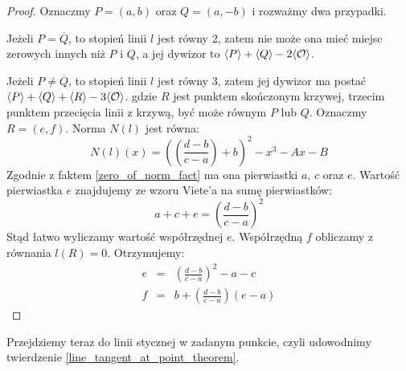 \begin{proof}
Oznaczmy $P = (a, b)$ oraz $Q = (a, -b)$
i rozważmy dwa przypadki.

Jeżeli $P = \overline{Q}$,
to stopień linii $l$ jest równy $2$,
zatem nie może ona mieć miejsc zerowych innych niż $P$ i $Q$,
a jej dywizor to $\langle P\rangle + \langle Q\rangle - 2\langle\mathcal{O}\rangle$.

Jeżeli $P \neq \overline{Q}$,
to stopień linii $l$ jest równy $3$,
zatem jej dywizor ma postać
$\langle P\rangle + \langle Q\rangle + \langle R\rangle - 3\langle\mathcal{O}\rangle$.
gdzie $R$ jest punktem skończonym krzywej,
trzecim punktem przecięcia linii z krzywą,
być może równym $P$ lub $Q$.
Oznaczmy $R = (e, f)$.
Norma $N(l)$ jest równa:
\begin{equation*}
N(l)(x) = \left(\left(\frac{d-b}{c-a}\right) + b\right)^2 - x^3 - Ax - B
\end{equation*}
Zgodnie z faktem \ref{zero_of_norm_fact}
ma ona pierwiastki $a$, $c$ oraz $e$.
Wartość pierwiastka $e$ znajdujemy ze wzoru Viete'a na sumę pierwiastków:
\begin{equation*}
a + c + e = \left(\frac{d-b}{c-a}\right)^2
\end{equation*}
Stąd łatwo wyliczamy wartość współrzędnej $e$.
Współrzędną $f$ obliczamy z równania $l(R) = 0$.
Otrzymujemy:
\begin{eqnarray}
\label{chord_line_third_point_x_eqn}
e & = & \left(\frac{d-b}{c-a}\right)^2 - a - c \\
\label{chord_line_third_point_y_eqn}
f & = & b + \left(\frac{d-b}{c-a}\right)(e-a)
\end{eqnarray}
\end{proof}

Przejdziemy teraz do linii stycznej w zadanym punkcie,
czyli udowodnimy twierdzenie \ref{line_tangent_at_point_theorem}.

